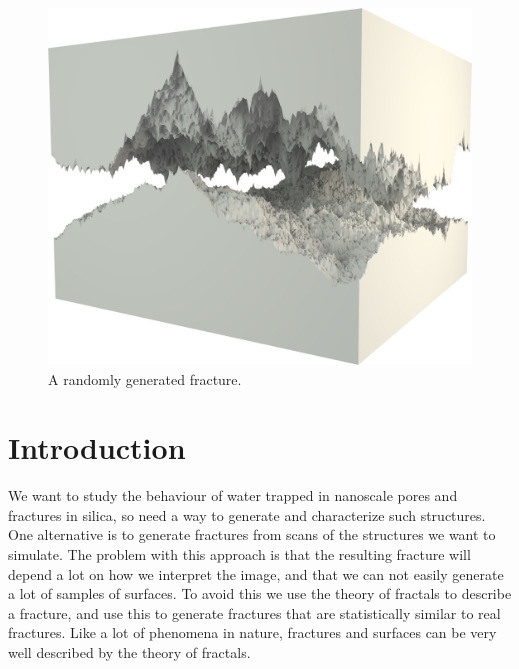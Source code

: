\vspace*{\fill}
\begin{figure}[hp!]%
\thispagestyle{empty}
    \centering%
    \includegraphics[width=\textwidth]{images/fracture/large_fracture05.jpg}%
    \caption{%
        A randomly generated fracture.%
    }%
\end{figure}%
\vspace{\fill}

\chapter{Introduction}
We want to study the behaviour of water trapped in nanoscale pores and fractures in silica, so need a way to generate and characterize such structures. One alternative is to generate fractures from scans of the structures we want to simulate. The problem with this approach is that the resulting fracture will depend a lot on how we interpret the image, and that we can not easily generate a lot of samples of surfaces. To avoid this we use the theory of fractals to describe a fracture, and use this to generate fractures that are statistically similar to real fractures. Like a lot of phenomena in nature, fractures and surfaces can be very well described by the theory of fractals\cite{mandelbrot1983fractal}.

